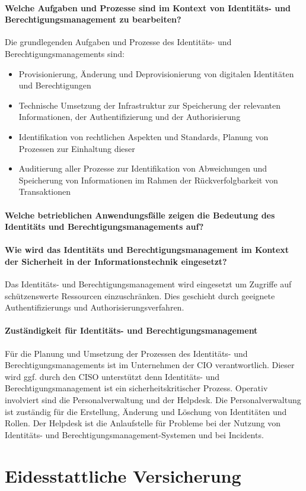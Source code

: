 \documentclass[12pt]{article}
\begin{document}
\paragraph{Welche Aufgaben und Prozesse sind im Kontext von Identitäts- und Berechtigungsmanagement zu bearbeiten?}
Die grundlegenden Aufgaben und Prozesse des Identitäts- und Berechtigungsmanagements sind:
\begin{itemize}
  \item Provisionierung, Änderung und Deprovisionierung von digitalen Identitäten und Berechtigungen
  \item Technische Umsetzung der Infrastruktur zur Speicherung der relevanten Informationen, der Authentifizierung und der Authorisierung
  \item Identifikation von rechtlichen Aspekten und Standards, Planung von Prozessen zur Einhaltung dieser
  \item Auditierung aller Prozesse zur Identifikation von Abweichungen und Speicherung von Informationen im Rahmen der Rückverfolgbarkeit von Transaktionen
\end{itemize}
\paragraph{Welche betrieblichen Anwendungsfälle zeigen die Bedeutung des Identitäts und Berechtigungsmanagements auf?}
\paragraph{Wie wird das Identitäts und Berechtigungsmanagement im Kontext der Sicherheit in der Informationstechnik eingesetzt?}
Das Identitäts- und Berechtigungsmanagement wird eingesetzt um Zugriffe auf schützenswerte Ressourcen einzuschränken. Dies geschieht durch geeignete Authentifizierungs und Authorisierungsverfahren.
\paragraph{Zuständigkeit für Identitäts- und Berechtigungsmanagement}
Für die Planung und Umsetzung der Prozessen des Identitäts- und Berechtigungsmanagements ist im Unternehmen der CIO verantwortlich. Dieser wird ggf. durch den CISO unterstützt denn Identitäts- und Berechtigungsmanagement ist ein sicherheitskritischer Prozess. Operativ involviert sind die Personalverwaltung und der Helpdesk. Die Personalverwaltung ist zuständig für die Erstellung, Änderung und Löschung von Identitäten und Rollen. Der Helpdesk ist die Anlaufstelle für Probleme bei der Nutzung von Identitäts- und Berechtigungsmanagement-Systemen und bei Incidents.
\newpage
\section{Eidesstattliche Versicherung}
\newpage
\printbibliography[notkeyword={quelle}, title={Literaturverzeichnis}]
\newpage
\printbibliography[keyword={quelle}, title={Quellenverzeichnis}]
\newpage
\listoffigures
\end{document}
